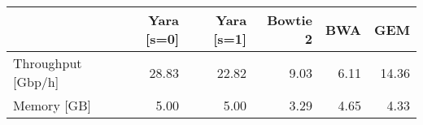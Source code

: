 \begin{tabular}{lrrrrr}
  \toprule
 & Yara [s=0] & Yara [s=1] & Bowtie 2 & BWA & GEM \\ 
  \midrule
Throughput [Gbp/h] & 28.83 & 22.82 & 9.03 & 6.11 & 14.36 \\ 
  Memory [GB] & 5.00 & 5.00 & 3.29 & 4.65 & 4.33 \\ 
   \bottomrule
\end{tabular}

